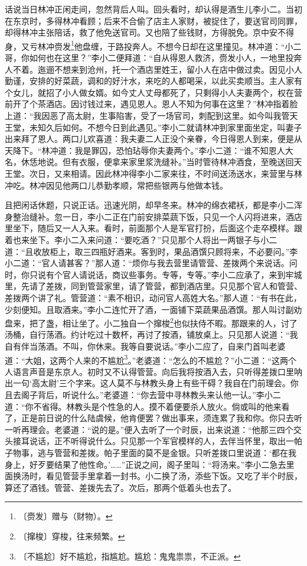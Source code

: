 \documentclass[12pt,UTF-8,openany]{ctexbook}
\begin{document}
\begin{normalsize}
    
    话说当日林冲正闲走间，忽然背后人叫。回头看时，却认得是酒生儿李小二。当初在东京时，多得林冲看顾；后来不合偷了店主人家财，被捉住了，要送官司同罪，却得林冲主张陪话，救了他免送官司。又也陪了些钱财，方得脱免。京中安不得身，又亏林冲赍发\footnote{〔赍发〕赠与（财物）。}他盘缠，于路投奔人。不想今日却在这里撞见。林冲道：“小二哥，你如何也在这里？”李小二便拜道：“自从得恩人救济，赍发小人，一地里投奔人不着。迤逦不想来到沧州，托一个酒店里姓王，留小人在店中做过卖。因见小人勤谨，安排的好菜蔬，调和的好汁水，来吃的人都喝采，以此买卖顺当。主人家有个女儿，就招了小人做女婿。如今丈人丈母都死了，只剩得小人夫妻两个，权在营前开了个茶酒店。因讨钱过来，遇见恩人。恩人不知为何事在这里？”林冲指着脸上道：“我因恶了高太尉，生事陷害，受了一场官司，刺配到这里。如今叫我管天王堂，未知久后如何。不想今日到此遇见。”李小二就请林冲到家里面坐定，叫妻子出来拜了恩人。两口儿欢喜道：我夫妻二人正没个亲眷，今日得恩人到来，便是从天降下。“林冲道：我是罪囚，恐怕玷辱你夫妻两个。”李小二道：“谁不知恩人大名，休恁地说。但有衣服，便拿来家里浆洗缝补。”当时管待林冲酒食，至晚送回天王堂。次日，又来相请。因此林冲得李小二家来往，不时间送汤送水，来营里与林冲吃。林冲因见他两口儿恭勤孝顺，常把些银两与他做本钱。
    
    且把闲话休题，只说正话。迅速光阴，却早冬来。林冲的绵衣裙袄，都是李小二浑身整治缝补。忽一日，李小二正在门前安排菜蔬下饭，只见一个人闪将进来，酒店里坐下，随后又一人入来。看时，前面那个人是军官打扮，后面这个走卒模样。跟着也来坐下。李小二入来问道：“要吃酒？”只见那个人将出一两银子与小二道：“且收放柜上，取三四瓶好酒来。客到时，果品酒馔只顾将来，不必要问。”李小二道：“官人请甚客？”那人道：“烦你与我去营里请管营、差拨两个来说话。问时，你只说有个官人请说话，商议些事务。专等，专等。”李小二应承了，来到牢城里，先请了差拨，同到管营家里，请了管营，都到酒店里。只见那个官人和管营、差拨两个讲了礼。管营道：“素不相识，动问官人高姓大名。”那人道：“有书在此，少刻便知。且取酒来。”李小二连忙开了酒，一面铺下菜蔬果品酒馔。那人叫讨副劝盘来，把了盏，相让坐了。小二独自一个撺梭\footnote{〔撺梭〕穿梭，往来频繁。}也似扶侍不暇。那跟来的人，讨了汤桶，自行荡酒。约计吃过十数杯，再讨了按酒，铺放桌上。只见那人说道：“我自有伴当荡酒。不叫，你休来。我等自要说话。”李小二应了，自来门首叫老婆道：“大姐，这两个人来的不尴尬\footnote{〔不尴尬〕好不尴尬，指尴尬。尴尬：鬼鬼祟祟，不正派。}。”老婆道：“怎么的不尴尬？”小二道：“这两个人语言声音是东京人。初时又不认得管营。向后我将按酒入去，只听得差拨口里呐出一句‘高太尉’三个字来。这人莫不与林教头身上有些干碍？我自在门前理会。你且去阁子背后，听说什么。”老婆道：“你去营中寻林教头来认他一认。”李小二道：“你不省得。林教头是个性急的人。摸不着便要杀人放火。倘或叫的他来看了，正是前日说的什么陆虞候，他肯便罢？做出事来，须连累了我和你。你只去听一听再理会。老婆道：“说的是。”便入去听了一个时辰，出来说道：“他那三四个交头接耳说话，正不听得说什么。只见那一个军官模样的人，去伴当怀里，取出一帕子物事，逃与管营和差拨。帕子里面的莫不是金银。只听差拨口里说道：‘都在我身上，好歹要结果了他性命。’……”正说之间，阁子里叫：“将汤来。”李小二急去里面换汤时，看见管营手里拿着一封书。小二换了汤，添些下饭。又吃了半个时辰，算还了酒钱。管营、差拨先去了。次后，那两个低着头也去了。
    

\end{normalsize}
\end{document}

